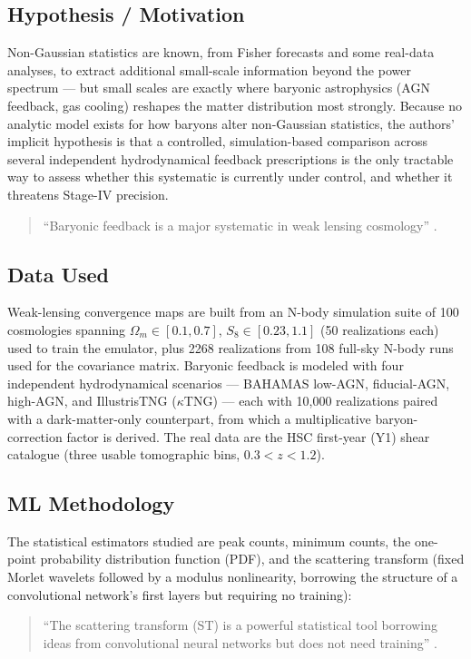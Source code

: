 \documentclass[11pt]{article}
\begin{document}
\subsection{Hypothesis / Motivation}
Non-Gaussian statistics are known, from Fisher forecasts and some real-data analyses, to extract additional small-scale information beyond the power spectrum — but small scales are exactly where baryonic astrophysics (AGN feedback, gas cooling) reshapes the matter distribution most strongly. Because no analytic model exists for how baryons alter non-Gaussian statistics, the authors' implicit hypothesis is that a controlled, simulation-based comparison across several independent hydrodynamical feedback prescriptions is the only tractable way to assess whether this systematic is currently under control, and whether it threatens Stage-IV precision.

\begin{quote}
\enquote{Baryonic feedback is a major systematic in weak lensing cosmology} \citep[p.~1]{grandon2024baryonic}.
\end{quote}

\subsection{Data Used}
Weak-lensing convergence maps are built from an N-body simulation suite of 100 cosmologies spanning $\Omega_m\in[0.1,0.7]$, $S_8\in[0.23,1.1]$ (50 realizations each) used to train the emulator, plus 2268 realizations from 108 full-sky N-body runs used for the covariance matrix. Baryonic feedback is modeled with four independent hydrodynamical scenarios — BAHAMAS low-AGN, fiducial-AGN, high-AGN, and IllustrisTNG ($\kappa$TNG) — each with 10{,}000 realizations paired with a dark-matter-only counterpart, from which a multiplicative baryon-correction factor is derived. The real data are the HSC first-year (Y1) shear catalogue (three usable tomographic bins, $0.3<z<1.2$).

\subsection{ML Methodology}
The statistical estimators studied are peak counts, minimum counts, the one-point probability distribution function (PDF), and the scattering transform (fixed Morlet wavelets followed by a modulus nonlinearity, borrowing the structure of a convolutional network's first layers but requiring no training):

\begin{quote}
\enquote{The scattering transform (ST) is a powerful statistical tool borrowing ideas from convolutional neural networks but does not need training} \citep[p.~5]{grandon2024baryonic}.
\end{quote}
\end{document}
